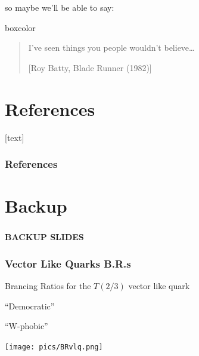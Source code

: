 \documentclass[xcolor=dvipsnames,10pt]{beamer}
\begin{document}
\begin{frame}
\begin{minipage}{.5\textwidth}
so maybe we'll be able to say:

\pause
\begin{minipage}{.1\textwidth}
\phantom{aaaaaa}
\end{minipage}\begin{minipage}{.9\textwidth}
\begin{beamercolorbox}[wd=.9\textwidth,rounded=true,shadow=true]{boxcolor}%
\begin{quote}
I've seen things you people wouldn't believe\dots

\vspace{\baselineskip}

\hfill \tiny [Roy Batty,  Blade Runner (1982)]
\end{quote}
\end{beamercolorbox}
\end{minipage}

\end{minipage}

\end{frame}



\appendix


\section*{References}
[text]

\begin{frame}[allowframebreaks]
\frametitle{References}\footnotesize
%
%
%

%
%

\end{frame}


\section*{Backup}

\begin{frame}
 \frametitle{}

\begin{center}{\bfseries
BACKUP SLIDES}
\end{center}
\end{frame}


\begin{frame}[label=vlqBR]\frametitle{Vector Like Quarks B.R.s \cite{Martin:2009bg}}
\footnotesize\centering

Brancing Ratios for the $T(2/3)$ vector like quark

\begin{minipage}{.5\textwidth}
\centering
``Democratic''
\end{minipage}\begin{minipage}{.5\textwidth}
\centering
``W-phobic''
\end{minipage}

\texttt{[image: pics/BRvlq.png]}

\end{frame}
\end{document}
